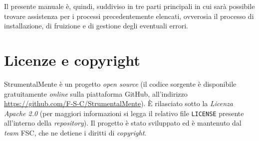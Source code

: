 Il presente manuale è, quindi, suddiviso in tre parti principali in cui
sarà possibile trovare assistenza per i processi precedentemente
elencati, ovverosia il processo di installazione, di fruizione e di
gestione degli eventuali errori.

\section{Licenze e copyright}

StrumentalMente è un progetto \emph{open source} (il codice sorgente è
disponibile gratuitamente \emph{online} sulla piattaforma GitHub,
all'indirizzo
\url{https://github.com/F-S-C/StrumentalMente}).
È rilasciato sotto la \emph{Licenza Apache 2.0} (per maggiori
informazioni si legga il relativo file \texttt{LICENSE} presente all'interno
della \emph{repository}). Il progetto è stato sviluppato ed è mantenuto
dal \emph{team} FSC, che ne detiene i diritti di \emph{copyright}.